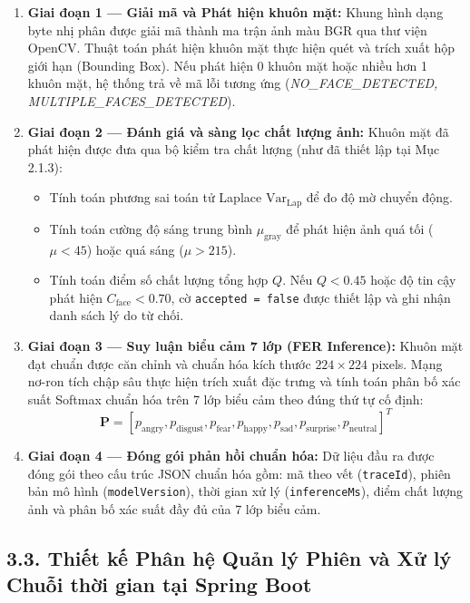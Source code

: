 \begin{enumerate}
    \item \textbf{Giai đoạn 1 — Giải mã và Phát hiện khuôn mặt:} Khung hình dạng byte nhị phân được giải mã thành ma trận ảnh màu BGR qua thư viện OpenCV. Thuật toán phát hiện khuôn mặt thực hiện quét và trích xuất hộp giới hạn (Bounding Box). Nếu phát hiện 0 khuôn mặt hoặc nhiều hơn 1 khuôn mặt, hệ thống trả về mã lỗi tương ứng (\textit{NO\_FACE\_DETECTED, MULTIPLE\_FACES\_DETECTED}).
    
    \item \textbf{Giai đoạn 2 — Đánh giá và sàng lọc chất lượng ảnh:}
    Khuôn mặt đã phát hiện được đưa qua bộ kiểm tra chất lượng (như đã thiết lập tại Mục 2.1.3):
    \begin{itemize}
        \item Tính toán phương sai toán tử Laplace $\text{Var}_{\text{Lap}}$ để đo độ mờ chuyển động.
        \item Tính toán cường độ sáng trung bình $\mu_{\text{gray}}$ để phát hiện ảnh quá tối ($\mu < 45$) hoặc quá sáng ($\mu > 215$).
        \item Tính toán điểm số chất lượng tổng hợp $Q$. Nếu $Q < 0.45$ hoặc độ tin cậy phát hiện $C_{\text{face}} < 0.70$, cờ \texttt{accepted = false} được thiết lập và ghi nhận danh sách lý do từ chối.
    \end{itemize}
    
    \item \textbf{Giai đoạn 3 — Suy luận biểu cảm 7 lớp (FER Inference):}
    Khuôn mặt đạt chuẩn được căn chỉnh và chuẩn hóa kích thước $224 \times 224$ pixels. Mạng nơ-ron tích chập sâu thực hiện trích xuất đặc trưng và tính toán phân bố xác suất Softmax chuẩn hóa trên 7 lớp biểu cảm theo đúng thứ tự cố định:
    \begin{equation}
    \bm{P} = [p_{\text{angry}}, p_{\text{disgust}}, p_{\text{fear}}, p_{\text{happy}}, p_{\text{sad}}, p_{\text{surprise}}, p_{\text{neutral}}]^T
    \end{equation}
    
    \item \textbf{Giai đoạn 4 — Đóng gói phản hồi chuẩn hóa:}
    Dữ liệu đầu ra được đóng gói theo cấu trúc JSON chuẩn hóa gồm: mã theo vết (\texttt{traceId}), phiên bản mô hình (\texttt{modelVersion}), thời gian xử lý (\texttt{inferenceMs}), điểm chất lượng ảnh và phân bố xác suất đầy đủ của 7 lớp biểu cảm.
\end{enumerate}

\subsection*{3.3. Thiết kế Phân hệ Quản lý Phiên và Xử lý Chuỗi thời gian tại Spring Boot}

